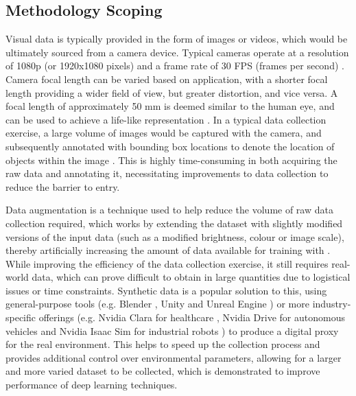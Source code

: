\documentclass[10pt]{article}
\begin{document}
\subsection{Methodology Scoping}
Visual data is typically provided in the form of images or videos, which would be ultimately sourced from a camera device. Typical cameras operate at a resolution of 1080p (or 1920x1080 pixels) and a frame rate of 30 FPS (frames per second) \cite{liu2013intelligent}. Camera focal length can be varied based on application, with a shorter focal length providing a wider field of view, but greater distortion, and vice versa. A focal length of approximately 50 mm is deemed similar to the human eye, and can be used to achieve a life-like representation \cite{neale2011photogrammetric}. In a typical data collection exercise, a large volume of images would be captured with the camera, and subsequently annotated with bounding box locations to denote the location of objects within the image \cite{hanbury2008survey}. This is highly time-consuming in both acquiring the raw data and annotating it, necessitating improvements to data collection to reduce the barrier to entry. 

Data augmentation is a technique used to help reduce the volume of raw data collection required, which works by extending the dataset with slightly modified versions of the input data (such as a modified brightness, colour or image scale), thereby artificially increasing the amount of data available for training with \cite{shorten2019survey}. While improving the efficiency of the data collection exercise, it still requires real-world data, which can prove difficult to obtain in large quantities due to logistical issues or time constraints. Synthetic data is a popular solution to this, using general-purpose tools (e.g. Blender \cite{sieczka2020blender}, Unity \cite{tremblay2018training}\cite{wang2021pixel} and Unreal Engine \cite{qiu2016unrealcv}\cite{wang2019learning}) or more industry-specific offerings (e.g. Nvidia Clara for healthcare \cite{clara}, Nvidia Drive for autonomous vehicles \cite{drive} and Nvidia Isaac Sim for industrial robots \cite{isaac}) to produce a digital proxy for the real environment. This helps to speed up the collection process and provides additional control over environmental parameters, allowing for a larger and more varied dataset to be collected, which is demonstrated to improve performance of deep learning techniques.
\end{document}
